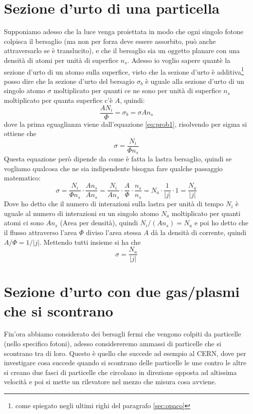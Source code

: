 \documentclass[11pt,a4paper]{article}
\begin{document}
	\section{Sezione d'urto di una particella}
		Supponiamo adesso che la luce venga proiettata in modo che ogni singolo fotone colpisca il bersaglio (ma non per forza deve essere assorbito, può anche attraversarlo se è translucito), e che il bersaglio sia un oggetto planare con una densità di atomi per unità di superfice $n_s$.\newline
		Adesso io voglio sapere quantè la sezione d'urto di un atomo sulla superfice, visto che la sezione d'urto è additiva\footnote{come spiegato negli ultimi righi del paragrafo \ref{sec:opaco}} posso dire che la sezione d'urto del bersagio $\sigma_b$ è uguale alla sezione d'urto di un singolo atomo $\sigma$ moltiplicato per quanti ce ne sono per unità di superfice $n_s$ moltiplicato per quanta superfice c'è $A$, quindi:
		\[
			\frac{AN_i}\Phi=\sigma_b=\sigma A n_s
		\]
		dove la prima eguaglianza viene dall'equazione \ref{eq:prob1}, risolvendo per sigma si ottiene che 
		\begin{equation}
			\sigma=\frac{N_i}{\Phi n_s}
			\label{eq:sez_lastra}
		\end{equation}
		Questa equazione però dipende da come è fatta la lastra bersaglio, quindi se vogliamo qualcosa che ne sia indipendente bisogna fare qualche passaggio matematico:
		\[
			\sigma=\frac{N_i}{\Phi n_s}\cdot \frac{An_s}{An_s}=
			\frac{N_i}{An_s}\cdot\frac A\Phi\cdot \frac {n_s}{n_s}=
			N_a\cdot \frac1{|j|}\cdot 1=\frac{N_a}{|j|}
		\]
		Dove ho detto che il numero di interazioni sulla lastra per unità di tempo $N_i$ è uguale al numero di interazioni su un singolo atomo $N_a$ moltiplicato per quanti atomi ci sono $An_s$ (Area per densità), quindi $N_i/(An_s)=N_a$ e poi ho detto che il flusso attraverso l'area $\Phi$ diviso l'area stessa $A$ dà la densità di corrente, quindi $A/\Phi=1/|j|$.\newline
		Mettendo tutti insieme si ha che 
		\begin{equation}
			\sigma=\frac{N_a}{|j|}
		\end{equation}

	\section{Sezione d'urto con due gas/plasmi che si scontrano}
		\label{sec:gas}
		Fin'ora abbiamo considerato dei bersagli fermi che vengono colpiti da particelle (nello specifico fotoni), adesso considereremo ammassi di particelle che si scontrano tra di loro.\newline
		Questo è quello che succede ad esempio al CERN, dove per investigare cosa succede quando si scontrano delle particelle le une contro le altre si creano due fasci di particelle che circolano in direzione opposta ad altissima velocità e poi si mette un rilevatore nel mezzo che misura cosa avviene.\newline
\end{document}
